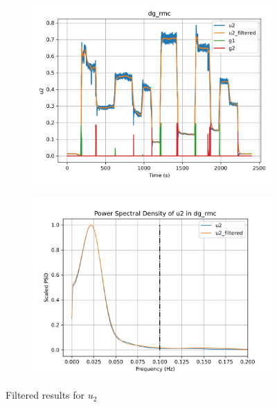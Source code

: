 \begin{figure}[H]

\begin{minipage}{0.49\textwidth}
        \begin{figure}[H]
                \centering
                \includegraphics[width = \textwidth]{./figs/tst_filt/dg_rmc/u2.png}
        \end{figure}
\end{minipage}
\begin{minipage}{0.49\textwidth}
        \begin{figure}[H]
                \centering
                \includegraphics[width = \textwidth]{./figs/tst_filt/dg_rmc/u2_psd.png}
        \end{figure}
\end{minipage}
\caption{Filtered results for $u_2$}

\end{figure}


